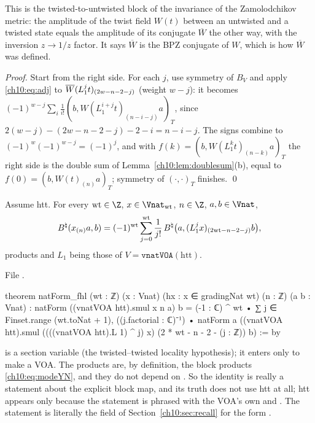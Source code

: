 \begin{physics}
This is the twisted-to-untwisted block of the invariance of the Zamolodchikov metric: the amplitude of the twist field $W(t)$ between an untwisted and a twisted state equals the amplitude of its conjugate $\overline W$ the other way, with the inversion $z\to1/z$ factor. It says $\overline W$ is the BPZ conjugate of $W$, which is how $\overline W$ was defined.
\end{physics}

\emph{Proof.}  Start from the right side.  For each $j$, use symmetry of $B_V$ and apply
\eqref{ch10:eq:adj} to $\overline{W}(L_1^jt)_{(2w-n-2-j)}$ (weight $w-j$): it becomes
$(-1)^{w-j}\sum_i\frac1{i!}(b,W(L_1^{i+j}t)_{(n-i-j)}a)_T$, since
$2(w-j)-(2w-n-2-j)-2-i=n-i-j$.  The signs combine to $(-1)^w(-1)^{w-j}=(-1)^j$, and with
$f(k)=(b,W(L_1^kt)_{(n-k)}a)_T$ the right side is the double sum of
Lemma~\ref{ch10:lem:doublesum}(b), equal to $f(0)=(b,W(t)_{(n)}a)_T$; symmetry of $(\cdot,\cdot)_T$
finishes. \qed

\begin{theorem}\label{ch10:thm:natfhl}
Assume htt.  For every $\mathrm{wt}\in\Z$, $x\in\Vnat_{\mathrm{wt}}$, $n\in\Z$, $a,b\in\Vnat$,
\begin{equation*}
 B^{\natural}(x_{(n)}a,b)=(-1)^{\mathrm{wt}}\sum_{j=0}^{\mathrm{wt}}\frac1{j!}\,
 B^{\natural}\bigl(a,(L_1^jx)_{(2\mathrm{wt}-n-2-j)}b\bigr),
\end{equation*}
products and $L_1$ being those of $V=\mathtt{vnatVOA}(\mathrm{htt})$.
\end{theorem}
\noindent File .
\begin{leancode}
theorem natForm_fhl (wt : ℤ) (x : Vnat) (hx : x ∈ gradingNat wt) (n : ℤ) (a b : Vnat) :
    natForm ((vnatVOA htt).smul x n a) b
      = (-1 : ℂ) ^ wt • ∑ j ∈ Finset.range (wt.toNat + 1), ((j.factorial : ℂ)⁻¹) •
          natForm a ((vnatVOA htt).smul ((((vnatVOA htt).L 1) ^ j) x) (2 * wt - n - 2 - (j : ℤ)) b) := by
\end{leancode}
\begin{dictionary}
 is a section variable (the twisted--twisted locality hypothesis); it enters only to
make  a VOA.  The products  are, by definition,
the block products \eqref{ch10:eq:modeYN}, and they do not depend on .  So the identity
is really a statement about the explicit block map, and its truth does not use htt at all; htt
appears only because the statement is phrased with the VOA's own  and .  The
statement is literally the field  of Section~\ref{ch10:sec:recall} for the
form .
\end{dictionary}

